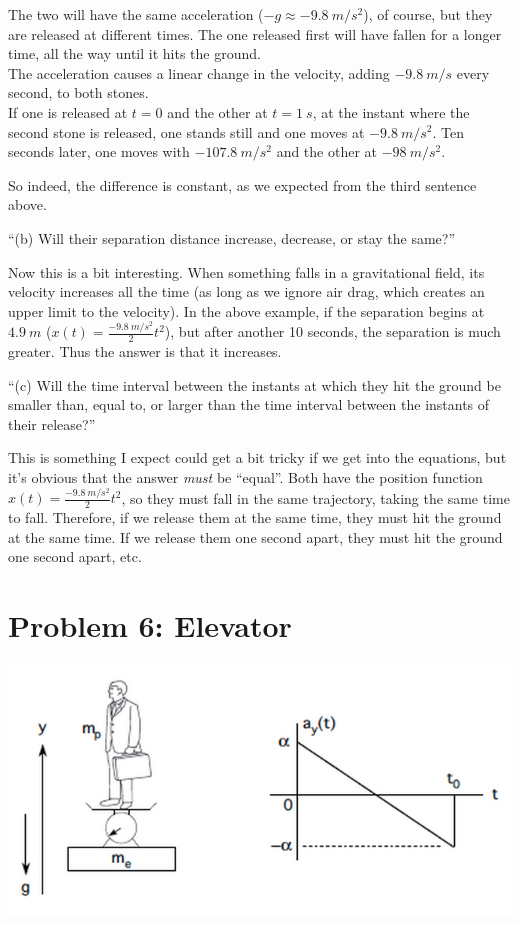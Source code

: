 \documentclass[8.01x]{subfiles}
\begin{document}
The two will have the same acceleration ($-g \approx \SI{-9.8}{m/s^2}$), of course, but they are released at different times. The one released first will have fallen for a longer time, all the way until it hits the ground.\\
The acceleration causes a linear change in the velocity, adding $\SI{-9.8}{m/s}$ every second, to both stones.\\
If one is released at $t=0$ and the other at $t = \SI{1}{s}$, at the instant where the second stone is released, one stands still and one moves at $\SI{-9.8}{m/s^2}$. Ten seconds later, one moves with $\SI{-107.8}{m/s^2}$ and the other at $\SI{-98}{m/s^2}$.

So indeed, the difference is constant, as we expected from the third sentence above.

``(b) Will their separation distance increase, decrease, or stay the same?''

Now this is a bit interesting. When something falls in a gravitational field, its velocity increases all the time (as long as we ignore air drag, which creates an upper limit to the velocity). In the above example, if the separation begins at $\SI{4.9}{m}$ ($\displaystyle x(t) = \frac{\SI{-9.8}{m/s^2}}{2} t^2$), but after another 10 seconds, the separation is much greater. Thus the answer is that it increases.

``(c) Will the time interval between the instants at which they hit the ground be smaller than, equal to, or larger than the time interval between the instants of their release?''

This is something I expect could get a bit tricky if we get into the equations, but it's obvious that the answer \emph{must} be ``equal''. Both have the position function $\displaystyle x(t) = \frac{\SI{-9.8}{m/s^2}}{2} t^2$, so they must fall in the same trajectory, taking the same time to fall. Therefore, if we release them at the same time, they must hit the ground at the same time. If we release them one second apart, they must hit the ground one second apart, etc.

\section{Problem 6: Elevator}

\begin{center}
\includegraphics[scale=0.8]{Graphics/h1p6}
\end{center}
\end{document}
